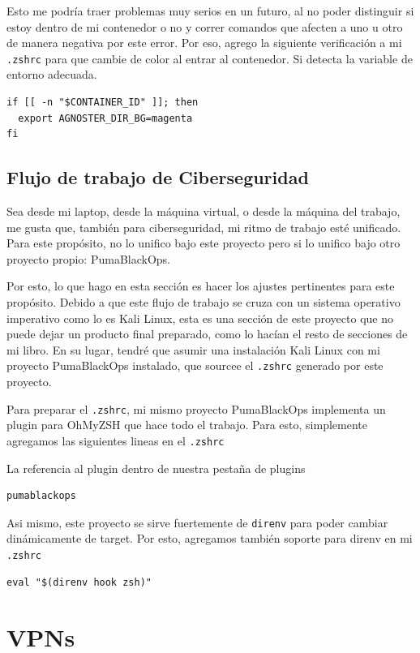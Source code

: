 \documentclass[11pt]{article}
\begin{document}
Esto me podría traer problemas muy serios en un futuro, al no poder distinguir si estoy dentro de mi contenedor o no y correr comandos que afecten a uno u otro de manera negativa por este error. Por eso, agrego la siguiente verificación a mi \texttt{.zshrc} para que cambie de color al entrar al contenedor. Si detecta la variable de entorno adecuada.

\begin{verbatim}
if [[ -n "$CONTAINER_ID" ]]; then
  export AGNOSTER_DIR_BG=magenta
fi
\end{verbatim}
\subsection{Flujo de trabajo de Ciberseguridad}
\label{sec:orgb705b44}

Sea desde mi laptop, desde la máquina virtual, o desde la máquina del trabajo, me gusta que, también para ciberseguridad, mi ritmo de trabajo esté unificado. Para este propósito, no lo unifico bajo este proyecto pero si lo unifico bajo otro proyecto propio: PumaBlackOps.

Por esto, lo que hago en esta sección es hacer los ajustes pertinentes para este propósito. Debido a que este flujo de trabajo se cruza con un sistema operativo imperativo como lo es Kali Linux, esta es una sección de este proyecto que no puede dejar un producto final preparado, como lo hacían el resto de secciones de mi libro. En su lugar, tendré que asumir una instalación Kali Linux con mi proyecto PumaBlackOps instalado, que sourcee el \texttt{.zshrc} generado por este proyecto.

Para preparar el \texttt{.zshrc}, mi mismo proyecto PumaBlackOps implementa un plugin para OhMyZSH que hace todo el trabajo. Para esto, simplemente agregamos las siguientes lineas en el \texttt{.zshrc}

La referencia al plugin dentro de nuestra pestaña de plugins

\begin{verbatim}
pumablackops
\end{verbatim}

Asi mismo, este proyecto se sirve fuertemente de \texttt{direnv} para poder cambiar dinámicamente de target. Por esto, agregamos también soporte para direnv en mi \texttt{.zshrc}

\begin{verbatim}
eval "$(direnv hook zsh)"
\end{verbatim}
\section{VPNs}
\label{sec:org1209e09}
\end{document}
